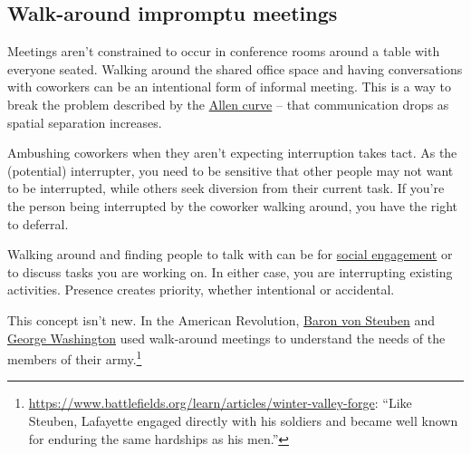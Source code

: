 \subsection*{Walk-around impromptu meetings\label{sec:walk-arounds}}

Meetings aren't constrained to occur in conference rooms around a table with everyone seated. Walking around the shared office space and having conversations with coworkers can be an intentional form of informal meeting. This is a way to break the problem described by the
 \href{https://en.wikipedia.org/wiki/Allen_curve}{Allen curve} -- that communication drops as spatial separation increases.
%

Ambushing coworkers when they aren't expecting interruption takes tact. As the (potential) interrupter, you need to be sensitive that other people may not want to be interrupted, while others seek diversion from their current task. If you're the person being interrupted by the coworker walking around, you have the right to deferral. 


Walking around and finding people to talk with can be for 
\hyperref[sec:socializing]{social engagement} 
%
or to discuss tasks you are working on. 
In either case, you are interrupting existing activities. Presence creates priority,
whether intentional or accidental.





This concept isn't new. 
In the American Revolution, \href{https://en.wikipedia.org/wiki/Friedrich_Wilhelm_von_Steuben}{Baron von Steuben}
\iftoggle{WPinmargin}{\marginpar{$>$Wikipedia: Baron von~Steuben}}{}
and 
\href{https://en.wikipedia.org/wiki/George_Washington}{George Washington}
used walk-around meetings to understand the needs of the members of their army.\footnote{\href{https://www.battlefields.org/learn/articles/winter-valley-forge}{https://www.battlefields.org/learn/articles/winter-valley-forge}: ``Like Steuben, Lafayette engaged directly with his soldiers and became well known for enduring the same hardships as his men.''}
